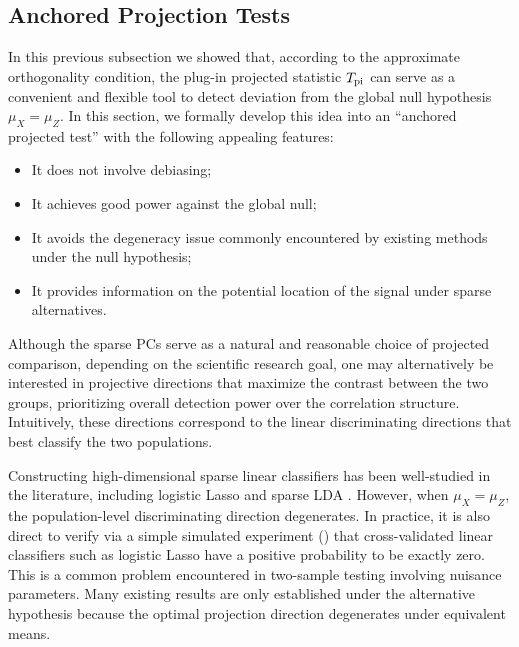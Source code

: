 \documentclass[11pt]{article}
\begin{document}
\subsection{Anchored Projection Tests}
\label{section: anchored lasso}

In this previous subsection we showed that, according to the approximate orthogonality condition, the plug-in projected statistic $T_{\rm pi}$ can serve as a convenient and flexible tool to detect deviation from the global null hypothesis $\mu_X=\mu_Z$. In this section, we formally develop this idea into an ``anchored projected test'' with the following appealing features:
\begin{itemize}
    \item It does not involve debiasing; 
    \item It achieves good power against the global null;
    \item It avoids the degeneracy issue commonly encountered by existing methods under the null hypothesis;
    \item It provides information on the potential location of the signal under sparse alternatives.
\end{itemize}

Although the sparse PCs serve as a natural and reasonable choice of projected comparison,
depending on the scientific research goal, one may alternatively be interested in projective directions that maximize the contrast between the two groups, prioritizing overall detection power over the correlation structure. Intuitively, these directions correspond to the linear discriminating directions that best classify the two populations.

Constructing high-dimensional sparse linear classifiers has been well-studied in the literature, including logistic Lasso \citep{tibshirani1996regression,van2008high} and sparse LDA \citep{cai2011direct}. However, when $\mu_X = \mu_Z$, the population-level discriminating direction degenerates. In practice, it is also direct to verify via a simple simulated experiment () that cross-validated linear classifiers such as logistic Lasso have a positive probability to be exactly zero. This is a common problem encountered in two-sample testing involving nuisance parameters. Many existing results \cite{liu2022multiple} are only established under the alternative hypothesis because the optimal projection direction degenerates under equivalent means.
\end{document}
